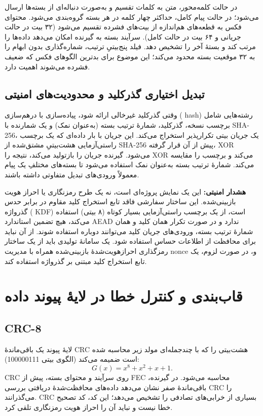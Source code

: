 \documentclass[12pt,a4paper]{article}
\providecommand{\lr}[1]{\foreignlanguage{english}{\begingroup\hyphenchar\font=-1 #1\endgroup}}
\begin{document}
در حالت کلمه‌محور، متن به کلمات تقسیم و به‌صورت دنباله‌ای از بسته‌ها ارسال می‌شود؛ در حالت پیام کامل، حداکثر چهار کلمه در هر بسته گروه‌بندی می‌شود. محتوای فکس به قطعه‌های هم‌اندازه از بیت‌های فشرده تقسیم می‌شود (۳۲ بیت در حالت جریانی و ۶۴ بیت در حالت کامل). سرآیند بسته به گیرنده امکان می‌دهد داده‌ها را مرتب کند و بستۀ آخر را تشخیص دهد. فیلد پنج‌بیتیِ ترتیب، شماره‌گذاری بدون ابهام را به ۳۲ موقعیت بسته محدود می‌کند؛ این موضوع برای بدترین الگوهای فکس که ضعیف فشرده می‌شوند اهمیت دارد.

\subsection{تبدیل اختیاری گذرکلید و محدودیت‌های امنیتی}
وقتی گذرکلید غیرخالی ارائه شود، پیاده‌سازی با درهم‌سازی (\lr{hash}) رشته‌هایی شامل برچسب نسخه، گذرکلید، شمارۀ ترتیب بسته (به‌عنوان نمک) و یک شمارنده با \lr{SHA-256}، یک جریان بیتی تکرارپذیر استخراج می‌کند. این جریان با بار داده‌ای که یک برچسب راستی‌آزمایی هشت‌بیتیِ مشتق‌شده از \lr{SHA-256} پیش از آن قرار گرفته، \lr{XOR} می‌شود. گیرنده جریان را بازتولید می‌کند، نتیجه را \lr{XOR} می‌کند و برچسب را مقایسه می‌کند. شمارۀ ترتیب بسته به‌عنوان نمک استفاده می‌شود تا بسته‌های مختلفِ یک پیام معمولاً ورودی‌های تبدیل متفاوتی داشته باشند.

\textbf{هشدار امنیتی:} این یک نمایش پروژه‌ای است، نه یک طرح رمزنگاری یا احراز هویت بازبینی‌شده. این ساختار سفارشی فاقد تابع استخراج کلید مقاوم در برابر حدس گذرواژه (\lr{KDF}) است، از یک برچسب راستی‌آزمایی بسیار کوتاه (۸ بیتی) استفاده می‌کند، هیچ تضمین استاندارد \lr{AEAD} ندارد و در صورت تکرار همان کلید و همان شمارۀ ترتیب بسته، ورودی‌های جریان کلید می‌توانند دوباره استفاده شوند. از آن نباید برای محافظت از اطلاعات حساس استفاده شود. یک سامانۀ تولیدی باید از یک ساختار رمزگذاری احراز‌هویت‌شدۀ بازبینی‌شده همراه با مدیریت \lr{nonce} و، در صورت لزوم، یک تابع استخراج کلید مبتنی بر گذرواژه استفاده کند.

\section{قاب‌بندی و کنترل خطا در لایۀ پیوند داده}
\label{sec:link}

\subsection{\lr{CRC-8}}
لایۀ پیوند یک باقی‌ماندۀ \lr{CRC} هشت‌بیتی را که با چندجمله‌ای مولد زیر محاسبه شده است ضمیمه می‌کند (الگوی بیتی \lr{100000111}):
\[
    G(x)=x^8+x^2+x+1 .
\]
\lr{CRC} روی سرآیند و محتوای بسته، پیش از \lr{FEC} محاسبه می‌شود. در گیرنده، باقی‌ماندۀ صفر نشان می‌دهد داده‌های محافظت‌شدۀ دریافتی بررسی \lr{CRC} را می‌گذرانند. \lr{CRC} بسیاری از خرابی‌های تصادفی را تشخیص می‌دهد؛ این کد، کد تصحیح خطا نیست و نباید آن را احراز هویت رمزنگاری تلقی کرد.
\end{document}
